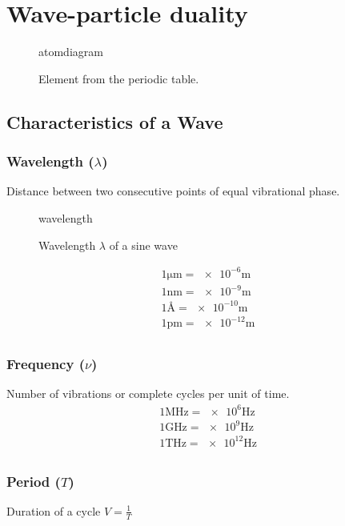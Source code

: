 \documentclass{article}[10pt]
\begin{document}
\section{Wave-particle duality}
\begin{figure}
	{atomdiagram}
	\caption{Element from the periodic table.}\label{fig:periodicelement}
\end{figure}

\subsection{Characteristics of a Wave}

\subsubsection*{Wavelength ($\lambda$)}
Distance between two consecutive points of equal vibrational phase.

\begin{figure}[H]
	\centering
	{wavelength}
	\caption{Wavelength $\lambda$ of a sine wave}\label{fig:wavelength}
\end{figure}
\begin{align*}
	1\si{\micro\metre} = \num{e-6}\si{\metre} \\[0.5em]
	1\si{\nano\metre} = \num{e-9}\si{\metre}  \\[0.5em]
	1\si{\angstrom} = \num{e-10}\si{\metre}   \\[0.5em]
	1\si{\pico\metre} = \num{e-12}\si{\metre} \\[0.5em]
\end{align*}

\subsubsection*{Frequency ($\nu$)}
Number of vibrations or complete cycles per unit of time.
\begin{align*}
	1\si{\mega\hertz} = \num{e6}\si{\hertz}  \\[0.5em]
	1\si{\giga\hertz} = \num{e9}\si{\hertz}  \\[0.5em]
	1\si{\tera\hertz} = \num{e12}\si{\hertz} \\[0.5em]
\end{align*}

\subsubsection*{Period ($T$)}
Duration of a cycle $V=\frac{1}{T}$
\end{document}
